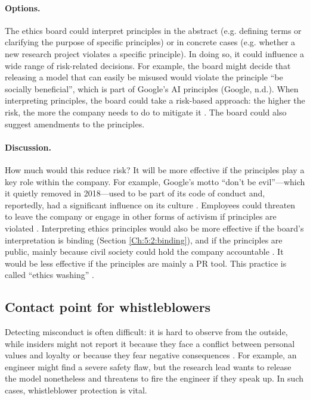 \documentclass{article}
\begin{document}
\paragraph{Options.} The ethics board could interpret principles in the abstract (e.g. defining terms or clarifying the purpose of specific principles) or in concrete cases (e.g. whether a new research project violates a specific principle). In doing so, it could influence a wide range of risk-related decisions. For example, the board might decide that releasing a model that can easily be misused would violate the principle “be socially beneficial”, which is part of Google’s AI principles (Google, n.d.). When interpreting principles, the board could take a risk-based approach: the higher the risk, the more the company needs to do to mitigate it \cite{baldwin2016driving, mahler2021between, chamberlain2022risk}. The board could also suggest amendments to the principles.

\paragraph{Discussion.} How much would this reduce risk? It will be more effective if the principles play a key role within the company. For example, Google’s motto “don’t be evil”—which it quietly removed in 2018—used to be part of its code of conduct and, reportedly, had a significant influence on its culture \cite{crofts2020negotiating}. Employees could threaten to leave the company or engage in other forms of activism if principles are violated \cite{belfield2020activism}. Interpreting ethics principles would also be more effective if the board’s interpretation is binding (Section \ref{Ch:5:2:binding}), and if the principles are public, mainly because civil society could hold the company accountable \cite{cihon2021corporate}. It would be less effective if the principles are mainly a PR tool. This practice is called “ethics washing” \cite{bietti2020ethics, seger2022defence, floridi2021translating}.

\subsection{Contact point for whistleblowers}\label{Ch:2:6:contact}

Detecting misconduct is often difficult: it is hard to observe from the outside, while insiders might not report it because they face a conflict between personal values and loyalty \cite{jubb1999whistleblowing, dungan2015psychology} or because they fear negative consequences \cite{bjorkelo2013workplace}. For example, an engineer might find a severe safety flaw, but the research lead wants to release the model nonetheless and threatens to fire the engineer if they speak up. In such cases, whistleblower protection is vital.
\end{document}
